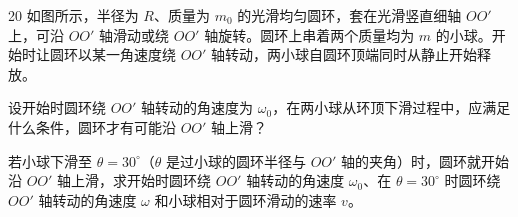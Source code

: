 \begin{problem}[第31届全国中学生物理竞赛复赛][圆环与小球系统]{20}
如图所示，半径为 $R$、质量为 $m_0$ 的光滑均匀圆环，套在光滑竖直细轴 $OO'$ 上，可沿 $OO'$ 轴滑动或绕 $OO'$ 轴旋转。圆环上串着两个质量均为 $m$ 的小球。开始时让圆环以某一角速度绕 $OO'$ 轴转动，两小球自圆环顶端同时从静止开始释放。
    \begin{subproblem}
        设开始时圆环绕 $OO'$ 轴转动的角速度为 $\omega_0$，在两小球从环顶下滑过程中，应满足什么条件，圆环才有可能沿 $OO'$ 轴上滑？
    \end{subproblem}
    \begin{subproblem}
        若小球下滑至 $\theta = 30^{\circ}$（$\theta$ 是过小球的圆环半径与 $OO'$ 轴的夹角）时，圆环就开始沿 $OO'$ 轴上滑，求开始时圆环绕 $OO'$ 轴转动的角速度 $\omega_0$、在 $\theta = 30^{\circ}$ 时圆环绕 $OO'$ 轴转动的角速度 $\omega$ 和小球相对于圆环滑动的速率 $v$。
    \end{subproblem}
\end{problem}
